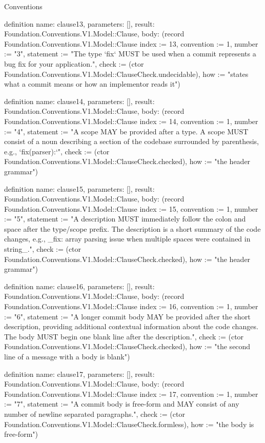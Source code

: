 \begin{lexlean}{Conventions}
\begin{semanticmodule}
definition{
  name: clause13,
  parameters: [],
  result: Foundation.Conventions.V1.Model::Clause,
  body: (record Foundation.Conventions.V1.Model::Clause {index := 13, convention := 1, number := "3", statement := "The type `fix` MUST be used when a commit represents a bug fix for your application.", check := (ctor Foundation.Conventions.V1.Model::ClauseCheck.undecidable), how := "states what a commit means or how an implementor reads it"})
}

definition{
  name: clause14,
  parameters: [],
  result: Foundation.Conventions.V1.Model::Clause,
  body: (record Foundation.Conventions.V1.Model::Clause {index := 14, convention := 1, number := "4", statement := "A scope MAY be provided after a type. A scope MUST consist of a noun describing a section of the codebase surrounded by parenthesis, e.g., `fix(parser):`", check := (ctor Foundation.Conventions.V1.Model::ClauseCheck.checked), how := "the header grammar"})
}

definition{
  name: clause15,
  parameters: [],
  result: Foundation.Conventions.V1.Model::Clause,
  body: (record Foundation.Conventions.V1.Model::Clause {index := 15, convention := 1, number := "5", statement := "A description MUST immediately follow the colon and space after the type/scope prefix. The description is a short summary of the code changes, e.g., _fix: array parsing issue when multiple spaces were contained in string_.", check := (ctor Foundation.Conventions.V1.Model::ClauseCheck.checked), how := "the header grammar"})
}

definition{
  name: clause16,
  parameters: [],
  result: Foundation.Conventions.V1.Model::Clause,
  body: (record Foundation.Conventions.V1.Model::Clause {index := 16, convention := 1, number := "6", statement := "A longer commit body MAY be provided after the short description, providing additional contextual information about the code changes. The body MUST begin one blank line after the description.", check := (ctor Foundation.Conventions.V1.Model::ClauseCheck.checked), how := "the second line of a message with a body is blank"})
}

definition{
  name: clause17,
  parameters: [],
  result: Foundation.Conventions.V1.Model::Clause,
  body: (record Foundation.Conventions.V1.Model::Clause {index := 17, convention := 1, number := "7", statement := "A commit body is free-form and MAY consist of any number of newline separated paragraphs.", check := (ctor Foundation.Conventions.V1.Model::ClauseCheck.formless), how := "the body is free-form"})
}


\end{semanticmodule}
\end{lexlean}
